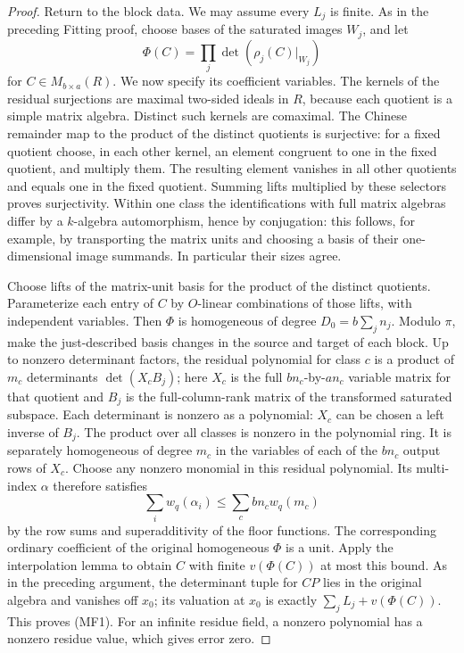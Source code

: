 \begin{proof}
Return to the block data. We may assume every \(L_j\) is finite.
As in the preceding Fitting proof, choose bases of the saturated
images \(W_j\), and let
\[
 \Phi(C)=\prod_j\det(\rho_j(C)|_{W_j})
\]
for \(C\in M_{b\times a}(R)\). We now specify its coefficient
variables. The kernels of the residual surjections are maximal
two-sided ideals in \(R\), because each quotient is a simple
matrix algebra. Distinct such kernels are comaximal. The
Chinese remainder map to the product of the distinct quotients
is surjective: for a fixed quotient choose, in each other
kernel, an element congruent to one in the fixed quotient,
and multiply them. The resulting element vanishes in all
other quotients and equals one in the fixed quotient. Summing
lifts multiplied by these selectors proves surjectivity.
Within one class the identifications with full matrix algebras
differ by a \(k\)-algebra automorphism, hence by conjugation:
this follows, for example, by transporting the matrix units
and choosing a basis of their one-dimensional image summands.
In particular their sizes agree.

Choose lifts of the matrix-unit basis for the product of the
distinct quotients. Parameterize each entry of \(C\) by
\(O\)-linear combinations of those lifts, with independent
variables. Then \(\Phi\) is homogeneous of degree
\(D_0=b\sum_j n_j\). Modulo \(\pi\), make the just-described
basis changes in the source and target of each block.
Up to nonzero determinant factors, the residual polynomial for
class \(c\) is a product of \(m_c\) determinants
\(\det(X_c B_j)\); here \(X_c\) is the full
\(bn_c\)-by-\(an_c\) variable matrix for that quotient and
\(B_j\) is the full-column-rank matrix of the transformed
saturated subspace. Each determinant is nonzero as a polynomial:
\(X_c\) can be chosen a left inverse of \(B_j\).
The product over all classes is nonzero in the polynomial ring.
It is separately homogeneous of degree \(m_c\) in the variables
of each of the \(bn_c\) output rows of \(X_c\).
Choose any nonzero monomial in this residual polynomial. Its
multi-index \(\alpha\) therefore satisfies
\[
 \sum_i w_q(\alpha_i)
 \le\sum_c bn_c w_q(m_c)
\]
by the row sums and superadditivity of the floor functions.
The corresponding ordinary coefficient of the original
homogeneous \(\Phi\) is a unit. Apply the interpolation lemma
to obtain \(C\) with finite \(v(\Phi(C))\) at most this bound.
As in the preceding argument, the determinant tuple for \(CP\)
lies in the original algebra and vanishes off \(x_0\); its
valuation at \(x_0\) is exactly \(\sum_jL_j+v(\Phi(C))\).
This proves (MF1). For an infinite residue field, a nonzero
polynomial has a nonzero residue value, which gives error zero.
\end{proof}


